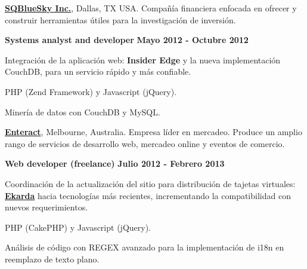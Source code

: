 \quarterblankline

\href{http://sqbluesky.com/}{\textbf{SQBlueSky Inc.}}, Dallas, TX USA. 
Compa\~n\'ia financiera enfocada en ofrecer y construir herramientas \'utiles
para la investigaci\'on de inversi\'on.
\begin{outerlist}
\item[] \textbf{Systems analyst and developer} \hfill \textbf{Mayo 2012 -
Octubre 2012}
    \begin{innerlist}
\item Integraci\'on de la aplicaci\'on web: \textbf{Insider Edge}
y la nueva implementaci\'on CouchDB, para un servicio r\'apido y m\'as
confiable.
\item PHP (Zend Framework) y Javascript (jQuery).
\item Miner\'ia de datos con CouchDB y MySQL.
    \end{innerlist}
\end{outerlist}

\quarterblankline

\href{http://www.enteract.com.au/}{\textbf{Enteract}}, Melbourne, Australia.
Empresa l\'ider en mercadeo. Produce un amplio rango de servicios de desarrollo
web, mercadeo online y eventos de comercio.
\begin{outerlist}
\item[] \textbf{Web developer (freelance)} \hfill \textbf{Julio 2012 - Febrero
2013}
    \begin{innerlist}
\item Coordinaci\'on de la actualizaci\'on del sitio para distribuci\'on de
tajetas virtuales: 
\href{https://my.ekarda.com/}{\textbf{Ekarda}} hacia tecnolog\'ias m\'as
recientes, incrementando la compatibilidad con nuevos requerimientos.
\item PHP (CakePHP) y Javascript (jQuery).
\item An\'alisis de c\'odigo con REGEX avanzado para la implementaci\'on de
i18n en reemplazo de texto plano.
    \end{innerlist}
\end{outerlist}

\quarterblankline

